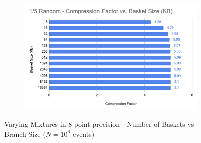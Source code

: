 \begin{figure}[h]
\begin{subfigure}{.5\textwidth}
        \label{fig:toymodel_328_compF_vs_basketsize_subC}
      \end{subfigure}%
      \begin{subfigure}{.5\textwidth}
        \centering
        \includegraphics[width=\textwidth]{content/toymodel_content/3.28/1_of_5.png}
        \label{fig:toymodel_328_compF_vs_basketsize_subD}
      \end{subfigure}%
    \caption{Varying Mixtures in 8 point precision - Number of Baskets vs Branch Size ($N=10^6$ events)}
    \label{fig:toymodel_328_compF_vs_basketsize}
\end{figure}

